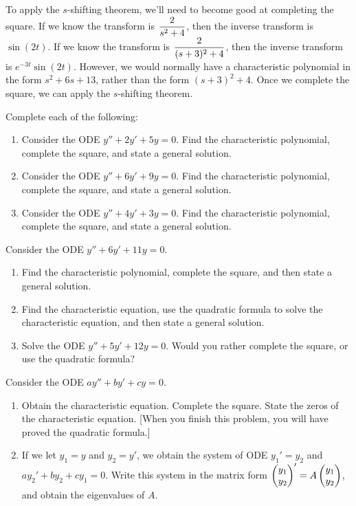 To apply the $s$-shifting theorem, we'll need to become good at completing the square.  
If we know the transform is $\displaystyle\frac{2}{s^2+4}$, then the inverse transform is $\sin(2t)$. 
If we know the transform is $\displaystyle\frac{2}{(s+3)^2+4}$, then the inverse transform is $e^{-3t}\sin(2t)$. 
However, we would normally have a characteristic polynomial in the form $s^2+6s+13$, rather than the form $(s+3)^2+4$. 
Once we complete the square, we can apply the $s$-shifting theorem.

\begin{problem}
Complete each of the following:
\begin{enumerate}
 \item Consider the ODE $y''+2y'+5y=0$. Find the characteristic polynomial, complete the square, and state a general solution.
 \item Consider the ODE $y''+6y'+9y=0$. Find the characteristic polynomial, complete the square, and state a general solution.  
 \item Consider the ODE $y''+4y'+3y=0$. Find the characteristic polynomial, complete the square, and state a general solution.  
\end{enumerate}
\end{problem}

\begin{problem}
 Consider the ODE $y''+6y'+11y=0$.  
 \begin{enumerate}
  \item Find the characteristic polynomial, complete the square, and then state a general solution.
  \item Find the characteristic equation, use the quadratic formula to solve the characteristic equation, and then state a general solution.
  \item Solve the ODE $y''+5y'+12y=0$. Would you rather complete the square, or use the quadratic formula?
 \end{enumerate}
\end{problem}

\begin{problem}
 Consider the ODE $ay''+by'+cy=0$. 
\begin{enumerate}
 \item Obtain the characteristic equation. Complete the square.  State the zeros of the characteristic equation. [When you finish this problem, you will have proved the quadratic formula.]
 \item If we let $y_1=y$ and $y_2=y'$, we obtain the system of ODE $y_1'=y_2$ and $ay_2'+by_2+cy_1=0$.  
 Write this system in the  matrix form $\begin{pmatrix} y_1\\y_2 \end{pmatrix}' = A \begin{pmatrix} y_1\\y_2 \end{pmatrix}$, and obtain the eigenvalues of $A$.  
\end{enumerate}
\end{problem}

